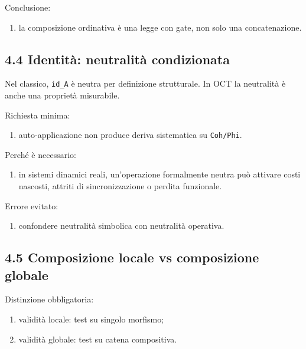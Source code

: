 Conclusione:

\begin{enumerate}
\def\labelenumi{\arabic{enumi}.}
\tightlist
\item
  la composizione ordinativa è una legge con gate, non solo una concatenazione.
\end{enumerate}

\subsection{4.4 Identità: neutralità condizionata}

Nel classico, \texttt{id\_A} è neutra per definizione strutturale. In OCT la neutralità è anche una proprietà misurabile.

Richiesta minima:

\begin{enumerate}
\def\labelenumi{\arabic{enumi}.}
\tightlist
\item
  auto-applicazione non produce deriva sistematica su \texttt{Coh/Phi}.
\end{enumerate}

Perché è necessario:

\begin{enumerate}
\def\labelenumi{\arabic{enumi}.}
\tightlist
\item
  in sistemi dinamici reali, un'operazione formalmente neutra può attivare costi nascosti, attriti di sincronizzazione o perdita funzionale.
\end{enumerate}

Errore evitato:

\begin{enumerate}
\def\labelenumi{\arabic{enumi}.}
\tightlist
\item
  confondere neutralità simbolica con neutralità operativa.
\end{enumerate}

\subsection{4.5 Composizione locale vs composizione globale}

Distinzione obbligatoria:

\begin{enumerate}
\def\labelenumi{\arabic{enumi}.}
\tightlist
\item
  validità locale: test su singolo morfismo;
\item
  validità globale: test su catena compositiva.
\end{enumerate}

